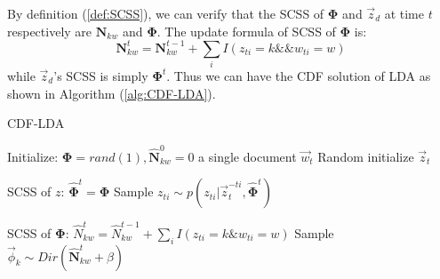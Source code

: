 \documentclass{article}
\begin{document}
By definition (\ref{def:SCSS}), we can verify that the SCSS of $\bm{\Phi}$ and $\vec{z}_d$ at time $t$ respectively are $\bm{N}_{kw}$ and $\bm{\Phi}$. The update formula of SCSS of $\bm{\Phi}$ is: 
$$\bm{N}_{kw}^t=\bm{N}_{kw}^{t-1}+\sum_i I(z_{ti}=k \&\& w_{ti}=w)$$
while $\vec{z}_{d}$'s SCSS is simply $\bm{\Phi}^t$. Thus we can have the CDF solution of LDA as shown in Algorithm (\ref{alg:CDF-LDA}).


\begin{algorithm}[tb]
   \caption{CDF-LDA}
   \label{alg:CDF-LDA}
\begin{algorithmic}
   \STATE Initialize: $\bm{\Phi}=rand(1), \hat{\bm{N}}_{kw}^0=0$
   		    a single document $\vec{w}_{t }$
   		   \STATE Random initialize $\vec{z}_{t }$
   		   
   		   \STATE SCSS of $z$: $\hat{\bm{\Phi}}^t=\bm{\Phi}$		   
	   		   \STATE Sample $z_{t i} \sim p(z_{ti}|\vec{z}_t^{-ti}, \hat{\bm{\Phi}}^t)$
   		   \ENDFOR
   		   
           \STATE SCSS of $\bm{\Phi}$: $\hat{N}_{kw}^t=\hat{N}_{kw}^{t-1}+\sum_i I(z_{ti}=k \& w_{ti}=w)$
   		   		\STATE Sample ${\vec{\phi}}_k \sim Dir(\hat{\bm{N}}_{kw}^t+\beta)$
   		   \ENDFOR
   \ENDFOR
\end{algorithmic}
\end{algorithm}
\end{document}
